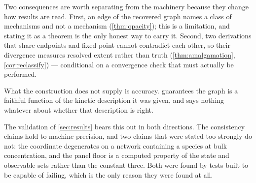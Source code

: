 \documentclass[11pt,twocolumn,a4paper]{article}
\theoremstyle{plain}
\theoremstyle{definition}
\theoremstyle{remark}
\begin{document}
Two consequences are worth separating from the machinery because they change how
results are read. First, an edge of the recovered graph names a class of
mechanisms and not a mechanism (\cref{thm:opacity}); this is a limitation, and
stating it as a theorem is the only honest way to carry it. Second, two
derivations that share endpoints and fixed point cannot contradict each other,
so their divergence measures resolved extent rather than truth
(\cref{thm:amalgamation}, \cref{cor:reclassify}) --- conditional on a
convergence check that must actually be performed.

What the construction does not supply is accuracy. 
guarantees the graph is a faithful function of the kinetic description it was
given, and says nothing whatever about whether that description is right.

The validation of \cref{sec:results} bears this out in both directions. The
consistency claims hold to machine precision, and two claims that were stated
too strongly do not: the coordinate degenerates on a network containing a
species at bulk concentration, and the panel floor is a computed property of the
state and observable sets rather than the constant three. Both were found by
tests built to be capable of failing, which is the only reason they were found
at all.



\end{document}
